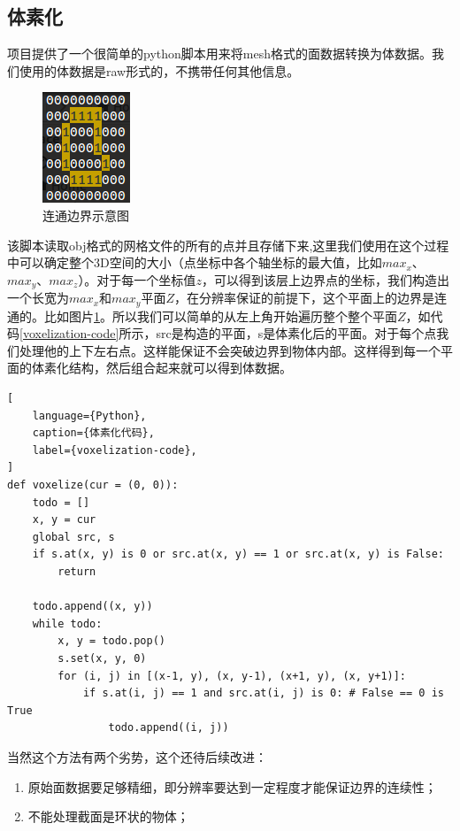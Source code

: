 \subsection{体素化}
项目提供了一个很简单的python脚本用来将mesh格式的面数据转换为体数据。我们使用的体数据是raw形式的，不携带任何其他信息。
\begin{figure}[h!]
    \centering
    \includegraphics[width=90bp]{figure/connected_boundary.png}
    \caption{连通边界示意图}
    \label{connected-boundary}
\end{figure}
该脚本读取obj格式的网格文件的所有的点并且存储下来,这里我们使用在这个过程中可以确定整个3D空间的大小（点坐标中各个轴坐标的最大值，比如$max_x$、$max_y$、$max_z$）。对于每一个坐标值$z$，可以得到该层上边界点的坐标，我们构造出一个长宽为$max_x$和$max_y$平面$Z$，在分辨率保证的前提下，这个平面上的边界是连通的。比如图片\ref{connected-boundary}。所以我们可以简单的从左上角开始遍历整个整个平面$Z$，如代码\ref{voxelization-code}所示，src是构造的平面，s是体素化后的平面。对于每个点我们处理他的上下左右点。这样能保证不会突破边界到物体内部。这样得到每一个平面的体素化结构，然后组合起来就可以得到体数据。
\begin{lstlisting}[
    language={Python},
    caption={体素化代码},
    label={voxelization-code},
]
def voxelize(cur = (0, 0)):
    todo = []
    x, y = cur
    global src, s
    if s.at(x, y) is 0 or src.at(x, y) == 1 or src.at(x, y) is False:
        return
    
    todo.append((x, y))
    while todo:
        x, y = todo.pop()
        s.set(x, y, 0)
        for (i, j) in [(x-1, y), (x, y-1), (x+1, y), (x, y+1)]:
            if s.at(i, j) == 1 and src.at(i, j) is 0: # False == 0 is True
                todo.append((i, j))
\end{lstlisting}

当然这个方法有两个劣势，这个还待后续改进：
\begin{enumerate}
    \item 原始面数据要足够精细，即分辨率要达到一定程度才能保证边界的连续性；
    \item 不能处理截面是环状的物体；
\end{enumerate}

